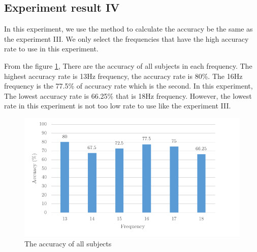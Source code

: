 \newpage
\subsection{Experiment result IV}

\hspace{1.5cm} In this experiment, we use the method to calculate the accuracy be the same as the experiment III. We only select the frequencies that have the high accuracy rate to use in this experiment. 

From the figure \ref{fig:acc5}, There are the accuracy of all subjects in each frequency. The highest accuracy rate is 13Hz frequency, the accuracy rate is 80\%. The 16Hz frequency is the 77.5\% of accuracy rate which is the second. In this experiment, The lowest accuracy rate is 66.25\% that is 18Hz frequency. However, the lowest rate in this experiment is not too low rate to use like the experiment III.

\begin{figure}[ht]
	\centering
	\includegraphics[scale = 1]{chapter7/exp5.pdf}
	\caption{The accuracy of all subjects}
    \label{fig:acc5}
\end{figure}

